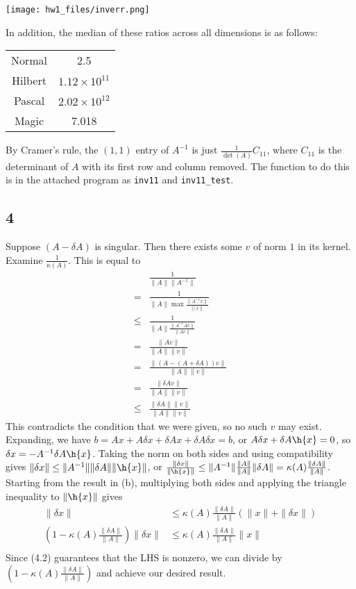\documentclass{article}
\begin{document}
\texttt{[image: hw1\_files/inverr.png]}

In addition, the median of these ratios across all dimensions is as follows:

\begin{tabular}{c|c}
    Normal&2.5\\
    Hilbert&$1.12\times10^{11}$\\
    Pascal&$2.02\times10^{12}$\\
    Magic&7.018\\
\end{tabular}

By Cramer's rule, the $(1,1)$ entry of $A^{-1}$ is just $\frac{1}{\det(A)}C_{11}$, where $C_{11}$ is the determinant of $A$ with its first row and column removed. The function to do this is in the attached program as \verb|inv11| and \verb|inv11_test|.

\subsection*{4}
Suppose $(A-\delta A)$ is singular. Then there exists some $v$ of norm $1$ in its kernel. Examine $\frac{1}{\kappa(A)}$. This is equal to
\begin{align*}
    &\frac{1}{\|A\|\|A^{-1}\|}\\
    =&\frac{1}{\|A\|\max\frac{\|A^{-1}x\|}{\|x\|}}\\
    \leq&\frac{1}{\|A\|\frac{\|A^{-1}Av\|}{\|Av\|}}\\
    =&\frac{\|Av\|}{\|A\|\|v\|}\\
    =&\frac{\|(A-(A+\delta A))v\|}{\|A\|\|v\|}\\
    =&\frac{\|\delta Av\|}{\|A\|\|v\|}\\
    \leq&\frac{\|\delta A\|\|v\|}{\|A\|\|v\|}
\end{align*}
This contradicts the condition that we were given, so no such $v$ may exist.
Expanding, we have $b=Ax+A\delta x+\delta Ax + \delta A\delta x=b$, or $A\delta x+\delta A\h{x}=0$, so $\delta x=-A^{-1}\delta A\h{x}$. Taking the norm on both sides and using compatibility gives $\|\delta x\|\leq\|A^{-1}\|\|\delta A\|\|\h{x}\|$, or $\frac{\|\delta x\|}{\|\h{x}\|}\leq\|A^{-1}\|\frac{\|A\|}{\|A\|}\|\delta A\|=\kappa(A)\frac{\|\delta A\|}{\|A\|}$.
Starting from the result in (b), multiplying both sides and applying the triangle inequality to $\|\h{x}\|$ gives 
\begin{align*}
    \|\delta x\|&\leq\kappa(A)\frac{\|\delta A\|}{\|A\|}(\|x\|+\|\delta x\|)\\
    \left(1-\kappa(A)\frac{\|\delta A\|}{\|A\|}\right)\|\delta x\|&\leq\kappa(A)\frac{\|\delta A\|}{\|A\|}\|x\|\\
\end{align*}
Since (4.2) guarantees that the LHS is nonzero, we can divide by $\left(1-\kappa(A)\frac{\|\delta A\|}{\|A\|}\right)$ and achieve our desired result.
\end{document}
